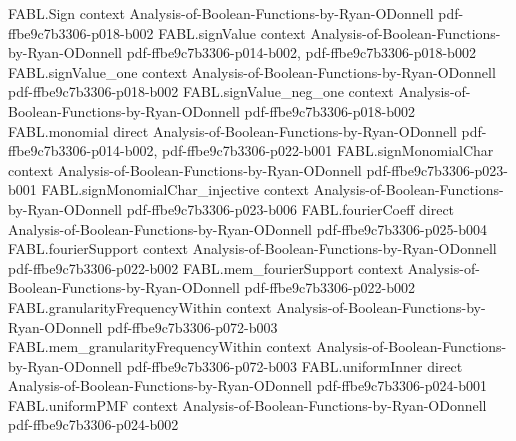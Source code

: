 \begin{theorem}
\label{FABL.FiniteFourierBasis.productInfluence_eq_sum_orthogonalComponent}
\leanok
{}
\proofstep
  {FABL.Sign}
  {context}
  {Analysis-of-Boolean-Functions-by-Ryan-ODonnell}
  {pdf-ffbe9c7b3306-p018-b002}
\proofstep
  {FABL.signValue}
  {context}
  {Analysis-of-Boolean-Functions-by-Ryan-ODonnell}
  {pdf-ffbe9c7b3306-p014-b002,
    pdf-ffbe9c7b3306-p018-b002}
\proofstep
  {FABL.signValue_one}
  {context}
  {Analysis-of-Boolean-Functions-by-Ryan-ODonnell}
  {pdf-ffbe9c7b3306-p018-b002}
\proofstep
  {FABL.signValue_neg_one}
  {context}
  {Analysis-of-Boolean-Functions-by-Ryan-ODonnell}
  {pdf-ffbe9c7b3306-p018-b002}
\proofstep
  {FABL.monomial}
  {direct}
  {Analysis-of-Boolean-Functions-by-Ryan-ODonnell}
  {pdf-ffbe9c7b3306-p014-b002,
    pdf-ffbe9c7b3306-p022-b001}
\proofstep
  {FABL.signMonomialChar}
  {context}
  {Analysis-of-Boolean-Functions-by-Ryan-ODonnell}
  {pdf-ffbe9c7b3306-p023-b001}
\proofstep
  {FABL.signMonomialChar_injective}
  {context}
  {Analysis-of-Boolean-Functions-by-Ryan-ODonnell}
  {pdf-ffbe9c7b3306-p023-b006}
\proofstep
  {FABL.fourierCoeff}
  {direct}
  {Analysis-of-Boolean-Functions-by-Ryan-ODonnell}
  {pdf-ffbe9c7b3306-p025-b004}
\proofstep
  {FABL.fourierSupport}
  {context}
  {Analysis-of-Boolean-Functions-by-Ryan-ODonnell}
  {pdf-ffbe9c7b3306-p022-b002}
\proofstep
  {FABL.mem_fourierSupport}
  {context}
  {Analysis-of-Boolean-Functions-by-Ryan-ODonnell}
  {pdf-ffbe9c7b3306-p022-b002}
\proofstep
  {FABL.granularityFrequencyWithin}
  {context}
  {Analysis-of-Boolean-Functions-by-Ryan-ODonnell}
  {pdf-ffbe9c7b3306-p072-b003}
\proofstep
  {FABL.mem_granularityFrequencyWithin}
  {context}
  {Analysis-of-Boolean-Functions-by-Ryan-ODonnell}
  {pdf-ffbe9c7b3306-p072-b003}
\proofstep
  {FABL.uniformInner}
  {direct}
  {Analysis-of-Boolean-Functions-by-Ryan-ODonnell}
  {pdf-ffbe9c7b3306-p024-b001}
\proofstep
  {FABL.uniformPMF}
  {context}
  {Analysis-of-Boolean-Functions-by-Ryan-ODonnell}
  {pdf-ffbe9c7b3306-p024-b002}

\end{theorem}

